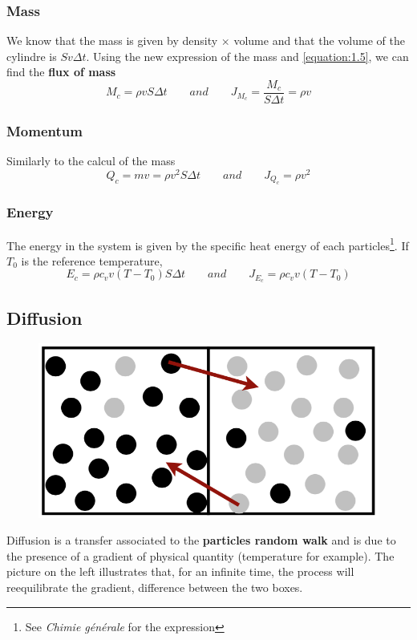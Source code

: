\subsubsection{Mass}
	We know that the mass is given by density $\times$ volume and that the volume of the cylindre is $Sv\Delta t$. Using the new expression of the mass and \eqref{equation:1.5}, we can find the \textbf{flux of mass} 
	\begin{equation}
		M_c = \rho v S \Delta t \qquad and \qquad  J_{M_c} = \frac{M_c}{S\Delta t} = \rho v
	\end{equation}
	
\subsubsection{Momentum}
	Similarly to the calcul of the mass
	\begin{equation}
		Q_c = mv = \rho v^2 S \Delta t \qquad and \qquad J_{Q_c} = \rho v^2
	\end{equation}
	
\subsubsection{Energy}
	The energy in the system is given by the specific heat energy of each particles\footnote{See \emph{Chimie générale} for the expression}. If $T_0$ is the reference temperature, 
	\begin{equation}
		E_c = \rho c_v v (T-T_0) S \Delta t \qquad and \qquad J_{E_c} = \rho c_v v (T-T_0)
	\end{equation}
	
\subsection{Diffusion}
	\begin{figure}
	\vspace{-5mm}
	\includegraphics[scale=0.26]{ch1/3}
	\end{figure}
	Diffusion is a transfer associated to the \textbf{particles	random walk} and is due to the presence of a gradient of physical quantity (temperature for example). The picture on the left illustrates that, for an infinite time, the process will reequilibrate the gradient, difference between the two boxes.
	

